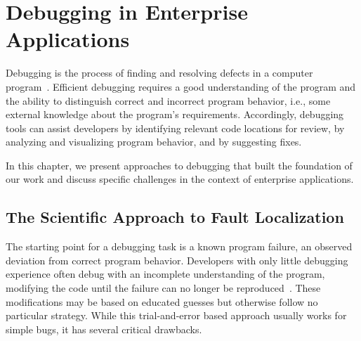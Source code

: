 \chapter{Debugging in Enterprise Applications}
\label{sec:debugging_in_ea}

Debugging is the process of finding and resolving defects in a computer program~\cite{araki91:a_general_framework}.
Efficient debugging requires a good understanding of the program and the ability to distinguish correct and incorrect program behavior, i.e., some external knowledge about the program's requirements.
Accordingly, debugging tools can assist developers by identifying relevant code locations for review, by analyzing and visualizing program behavior, and by suggesting fixes.

In this chapter, we present approaches to debugging that built the foundation of our work and discuss specific challenges in the context of enterprise applications.

\section{The Scientific Approach to Fault Localization}


The starting point for a debugging task is a known program failure, an observed deviation from correct program behavior.
Developers with only little debugging experience often debug with an incomplete understanding of the program, modifying the code until the failure can no longer be reproduced~\cite{gugerty86:comprehension_differences_in_debugging}.
These modifications may be based on educated guesses but otherwise follow no particular strategy.
While this trial-and-error based approach usually works for simple bugs, it has several critical drawbacks.


